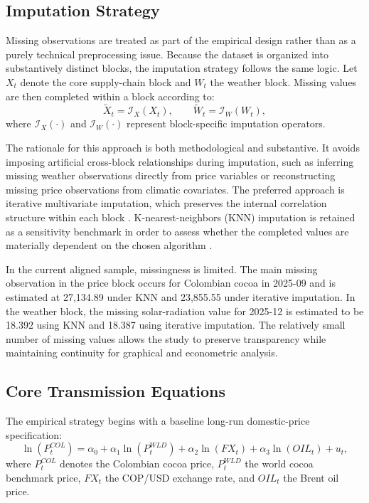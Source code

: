 \documentclass[11pt]{article}
\begin{document}
\subsection{Imputation Strategy}

Missing observations are treated as part of the empirical design rather than as a purely technical preprocessing issue. Because the dataset is organized into substantively distinct blocks, the imputation strategy follows the same logic. Let $X_t$ denote the core supply-chain block and $W_t$ the weather block. Missing values are then completed within a block according to:
\begin{equation}
\tilde{X}_t = \mathcal{I}_{X}(X_t), \qquad \tilde{W}_t = \mathcal{I}_{W}(W_t),
\label{eq:block_imputation}
\end{equation}
where $\mathcal{I}_{X}(\cdot)$ and $\mathcal{I}_{W}(\cdot)$ represent block-specific imputation operators.

The rationale for this approach is both methodological and substantive. It avoids imposing artificial cross-block relationships during imputation, such as inferring missing weather observations directly from price variables or reconstructing missing price observations from climatic covariates. The preferred approach is iterative multivariate imputation, which preserves the internal correlation structure within each block \citep{vanbuuren_groothuisoudshoorn_2011}. K-nearest-neighbors (KNN) imputation is retained as a sensitivity benchmark in order to assess whether the completed values are materially dependent on the chosen algorithm \citep{troyanskaya_etal_2001}.

In the current aligned sample, missingness is limited. The main missing observation in the price block occurs for Colombian cocoa in 2025-09 and is estimated at 27{,}134.89 under KNN and 23{,}855.55 under iterative imputation. In the weather block, the missing solar-radiation value for 2025-12 is estimated to be 18.392 using KNN and 18.387 using iterative imputation. The relatively small number of missing values allows the study to preserve transparency while maintaining continuity for graphical and econometric analysis.

\subsection{Core Transmission Equations}

The empirical strategy begins with a baseline long-run domestic-price specification:
\begin{equation}
\ln(P^{COL}_{t}) = \alpha_0 + \alpha_1 \ln(P^{WLD}_{t}) + \alpha_2 \ln(FX_t) + \alpha_3 \ln(OIL_t) + u_t,
\label{eq:core_levels}
\end{equation}
where $P^{COL}_{t}$ denotes the Colombian cocoa price, $P^{WLD}_{t}$ the world cocoa benchmark price, $FX_t$ the COP/USD exchange rate, and $OIL_t$ the Brent oil price.
\end{document}
